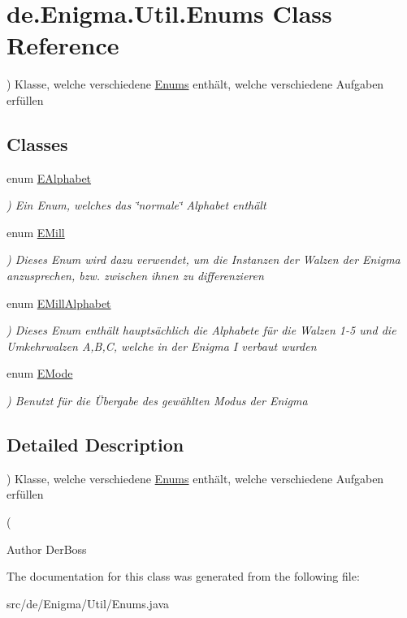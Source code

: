 \hypertarget{classde_1_1_enigma_1_1_util_1_1_enums}{}\section{de.\+Enigma.\+Util.\+Enums Class Reference}
\label{classde_1_1_enigma_1_1_util_1_1_enums}


) Klasse, welche verschiedene \hyperlink{classde_1_1_enigma_1_1_util_1_1_enums}{Enums} enthält, welche verschiedene Aufgaben erfüllen  


\subsection*{Classes}
\begin{DoxyCompactItemize}
\item 
enum \hyperlink{enumde_1_1_enigma_1_1_util_1_1_enums_1_1_e_alphabet}{E\+Alphabet}
\begin{DoxyCompactList}\small\item\em ) Ein Enum, welches das \char`\"{}normale\char`\"{} Alphabet enthält \end{DoxyCompactList}\item 
enum \hyperlink{enumde_1_1_enigma_1_1_util_1_1_enums_1_1_e_mill}{E\+Mill}
\begin{DoxyCompactList}\small\item\em ) Dieses Enum wird dazu verwendet, um die Instanzen der Walzen der Enigma anzusprechen, bzw. zwischen ihnen zu differenzieren \end{DoxyCompactList}\item 
enum \hyperlink{enumde_1_1_enigma_1_1_util_1_1_enums_1_1_e_mill_alphabet}{E\+Mill\+Alphabet}
\begin{DoxyCompactList}\small\item\em ) Dieses Enum enthält hauptsächlich die Alphabete für die Walzen 1-\/5 und die Umkehrwalzen A,B,C, welche in der Enigma I verbaut wurden \end{DoxyCompactList}\item 
enum \hyperlink{enumde_1_1_enigma_1_1_util_1_1_enums_1_1_e_mode}{E\+Mode}
\begin{DoxyCompactList}\small\item\em ) Benutzt für die Übergabe des gewählten Modus der Enigma \end{DoxyCompactList}\end{DoxyCompactItemize}


\subsection{Detailed Description}
) Klasse, welche verschiedene \hyperlink{classde_1_1_enigma_1_1_util_1_1_enums}{Enums} enthält, welche verschiedene Aufgaben erfüllen 

(\begin{DoxyAuthor}{Author}
Der\+Boss 
\end{DoxyAuthor}


The documentation for this class was generated from the following file\+:\begin{DoxyCompactItemize}
\item 
src/de/\+Enigma/\+Util/Enums.\+java\end{DoxyCompactItemize}
